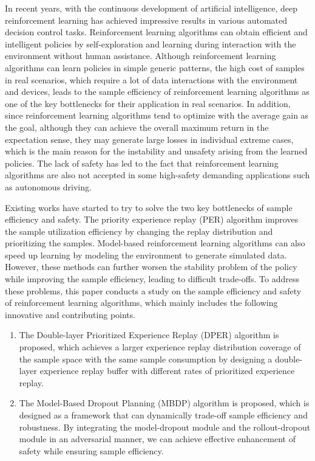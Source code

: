 \begin{abstract*}
In recent years, with the continuous development of artificial intelligence, deep reinforcement learning has achieved impressive results in various automated decision control tasks. Reinforcement learning algorithms can obtain efficient and intelligent policies by self-exploration and learning during interaction with the environment without human assistance. Although reinforcement learning algorithms can learn policies in simple generic patterns, the high cost of samples in real scenarios, which require a lot of data interactions with the environment and devices, leads to the sample efficiency of reinforcement learning algorithms as one of the key bottlenecks for their application in real scenarios. In addition, since reinforcement learning algorithms tend to optimize with the average gain as the goal, although they can achieve the overall maximum return in the expectation sense, they may generate large losses in individual extreme cases, which is the main reason for the instability and unsafety arising from the learned policies. The lack of safety has led to the fact that reinforcement learning algorithms are also not accepted in some high-safety demanding applications such as autonomous driving.

Existing works have started to try to solve the two key bottlenecks of sample efficiency and safety. The priority experience replay (PER) algorithm improves the sample utilization efficiency by changing the replay distribution and prioritizing the samples. Model-based reinforcement learning algorithms can also speed up learning by modeling the environment to generate simulated data. However, these methods can further worsen the stability problem of the policy while improving the sample efficiency, leading to difficult trade-offs. To address these problems, this paper conducts a study on the sample efficiency and safety of reinforcement learning algorithms, which mainly includes the following innovative and contributing points.

\begin{enumerate}
    \item The Double-layer Prioritized Experience Replay (DPER) algorithm is proposed, which achieves a larger experience replay distribution coverage of the sample space with the same sample consumption by designing a double-layer experience replay buffer with different rates of prioritized experience replay.

    \item The Model-Based Dropout Planning (MBDP) algorithm is proposed, which is designed as a framework that can dynamically trade-off sample efficiency and robustness. By integrating the model-dropout module and the rollout-dropout module in an adversarial manner, we can achieve effective enhancement of safety while ensuring sample efficiency.


\end{enumerate}
\end{abstract*}
